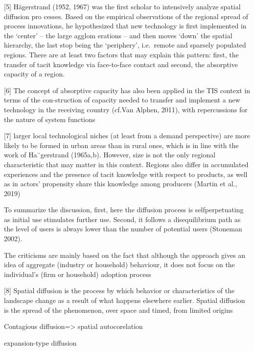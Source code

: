 \documentclass[10pt,letterpaper]{article}
\begin{document}
{[}5{]} Hägerstrand (1952, 1967) was the first scholar to intensively
analyze spatial diffusion pro cesses. Based on the empirical
observations of the regional spread of process innovations, he
hypothesized that new technology is first implemented in the `center' --
the large agglom erations -- and then moves `down' the spatial
hierarchy, the last stop being the `periphery', i.e.~remote and sparsely
populated regions. There are at least two factors that may explain this
pattern: first, the transfer of tacit knowledge via face-to-face contact
and second, the absorptive capacity of a region.

{[}6{]} The concept of absorptive capacity has also been applied in the
TIS context in terms of the con-struction of capacity needed to transfer
and implement a new technology in the receiving country (cf.Van Alphen,
2011), with repercussions for the nature of system functions

{[}7{]} larger local technological niches (at least from a demand
perspective) are more likely to be formed in urban areas than in rural
ones, which is in line with the work of Ha¨gerstrand (1965a,b). However,
size is not the only regional characteristic that may matter in this
context. Regions also differ in accumulated experiences and the presence
of tacit knowledge with respect to products, as well as in actors'
propensity share this knowledge among producers (Martin et al., 2019)

To summarize the discussion, first, here the diffusion process is
selfperpetuating as initial use stimulates further use. Second, it
follows a disequilibrium path as the level of users is always lower than
the number of potential users (Stoneman 2002).

The criticisms are mainly based on the fact that although the approach
gives an idea of aggregate (industry or household) behaviour, it does
not focus on the individual's (firm or household) adoption process

{[}8{]} Spatial diffusion is the process by which behavior or
characteristics of the landscape change as a result of what happens
elsewhere earlier. Spatial diffusion is the spread of the phenomenon,
over space and timed, from limited origins

Contagious diffusion=\textgreater{} spatial autocorelation

expansion-type diffusion
\end{document}
